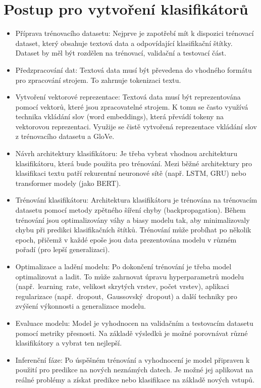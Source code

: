 \section{Postup pro vytvoření klasifikátorů}
\begin{itemize}\label{Postup}
    \item Příprava trénovacího datasetu: Nejprve je zapotřebí mít k dispozici trénovací dataset, který obsahuje textová data a odpovídající klasifikační štítky. Dataset by měl být rozdělen na trénovací, validační a testovací část.
    \item Předzpracování dat: Textová data musí být převedena do vhodného formátu pro zpracování strojem. To zahrnuje tokenizaci textu.
    \item Vytvoření vektorové reprezentace: Textová data musí být reprezentována pomocí vektorů, které jsou zpracovatelné strojem. K tomu se často využívá technika vkládání slov (word embeddings), která převádí tokeny na vektorovou reprezentaci. Využije se čistě vytvořená reprezentace vkládání slov z trénovacího datasetu a GloVe.
    \item Návrh architektury klasifikátoru: Je třeba vybrat vhodnou architekturu klasifikátoru, která bude použita pro trénování. Mezi běžné architektury pro klasifikaci textu patří rekurentní neuronové sítě (např. LSTM, GRU) nebo transformer modely (jako BERT).
    \item Trénování klasifikátoru: Architektura klasifikátoru je trénována na trénovacím datasetu pomocí metody zpětného šíření chyby (backpropagation). Během trénování jsou optimalizovány váhy a biasy modelu tak, aby minimalizovaly chybu při predikci klasifikačních štítků. Trénování může probíhat po několik epoch, přičemž v každé epoše jsou data prezentována modelu v různém pořadí (pro lepší generalizaci).
    \item Optimalizace a ladění modelu: Po dokončení trénování je třeba model optimalizovat a ladit. To může zahrnovat úpravu hyperparametrů modelu (např.~learning~rate, velikost skrytých vrstev, počet vrstev), aplikaci regularizace (např.~dropout,~Gaussovský~dropout) a další techniky pro zvýšení výkonnosti a generalizace modelu.
    \item Evaluace modelu: Model je vyhodnocen na validačním a testovacím datasetu pomocí metriky přesnosti. Na základě výsledků je možné porovnávat různé klasifikátory a vybrat ten nejlepší.
	\item Inferenční fáze: Po úspěšném trénování a vyhodnocení je model připraven k použití pro predikce na nových neznámých datech. Je možné jej aplikovat na reálné problémy a získat predikce nebo klasifikace na základě nových vstupů.
\end{itemize} 

